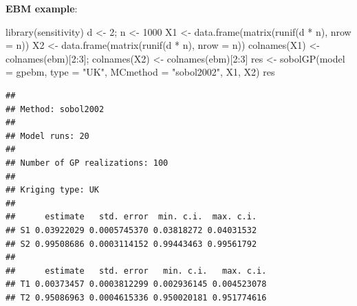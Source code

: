 \documentclass[
  ignorenonframetext,
]{beamer}
\newenvironment{Shaded}{\begin{snugshade}}{\end{snugshade}}
\newcommand{\AttributeTok}[1]{\textcolor[rgb]{0.77,0.63,0.00}{#1}}
\newcommand{\DecValTok}[1]{\textcolor[rgb]{0.00,0.00,0.81}{#1}}
\newcommand{\FunctionTok}[1]{\textcolor[rgb]{0.00,0.00,0.00}{#1}}
\newcommand{\NormalTok}[1]{#1}
\newcommand{\OtherTok}[1]{\textcolor[rgb]{0.56,0.35,0.01}{#1}}
\newcommand{\SpecialCharTok}[1]{\textcolor[rgb]{0.00,0.00,0.00}{#1}}
\newcommand{\StringTok}[1]{\textcolor[rgb]{0.31,0.60,0.02}{#1}}
\begin{document}
\begin{frame}[fragile]{}
\protect\hypertarget{section-61}{}
\textbf{EBM example}:

\begin{Shaded}
\begin{Highlighting}[]
\FunctionTok{library}\NormalTok{(sensitivity)}
\NormalTok{d }\OtherTok{\textless{}{-}} \DecValTok{2}\NormalTok{; n }\OtherTok{\textless{}{-}} \DecValTok{1000}
\NormalTok{X1 }\OtherTok{\textless{}{-}} \FunctionTok{data.frame}\NormalTok{(}\FunctionTok{matrix}\NormalTok{(}\FunctionTok{runif}\NormalTok{(d }\SpecialCharTok{*}\NormalTok{ n), }\AttributeTok{nrow =}\NormalTok{ n))}
\NormalTok{X2 }\OtherTok{\textless{}{-}} \FunctionTok{data.frame}\NormalTok{(}\FunctionTok{matrix}\NormalTok{(}\FunctionTok{runif}\NormalTok{(d }\SpecialCharTok{*}\NormalTok{ n), }\AttributeTok{nrow =}\NormalTok{ n))}
\FunctionTok{colnames}\NormalTok{(X1) }\OtherTok{\textless{}{-}} \FunctionTok{colnames}\NormalTok{(ebm)[}\DecValTok{2}\SpecialCharTok{:}\DecValTok{3}\NormalTok{]; }\FunctionTok{colnames}\NormalTok{(X2) }\OtherTok{\textless{}{-}} \FunctionTok{colnames}\NormalTok{(ebm)[}\DecValTok{2}\SpecialCharTok{:}\DecValTok{3}\NormalTok{]}
\NormalTok{res }\OtherTok{\textless{}{-}} \FunctionTok{sobolGP}\NormalTok{(}\AttributeTok{model =}\NormalTok{ gpebm, }\AttributeTok{type =} \StringTok{"UK"}\NormalTok{, }\AttributeTok{MCmethod =} \StringTok{"sobol2002"}\NormalTok{, X1, X2)}
\NormalTok{res}
\end{Highlighting}
\end{Shaded}

\begin{verbatim}
## 
## Method: sobol2002
## 
## Model runs: 20 
## 
## Number of GP realizations: 100 
## 
## Kriging type: UK 
## 
##      estimate   std. error  min. c.i.  max. c.i.
## S1 0.03922029 0.0005745370 0.03818272 0.04031532
## S2 0.99508686 0.0003114152 0.99443463 0.99561792
## 
##      estimate   std. error   min. c.i.   max. c.i.
## T1 0.00373457 0.0003812299 0.002936145 0.004523078
## T2 0.95086963 0.0004615336 0.950020181 0.951774616
\end{verbatim}
\end{frame}
\end{document}
